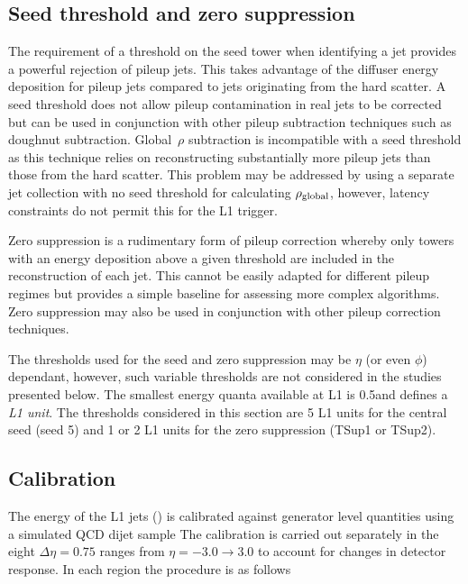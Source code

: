 \subsection{Seed threshold and zero suppression}
\label{sec:seed_thresh}

The requirement of a threshold on the seed tower when identifying a jet
provides a powerful rejection of pileup jets. This takes advantage of the
diffuser energy deposition for pileup jets compared to jets originating from 
the hard scatter. A seed threshold does not allow pileup contamination in real jets to be corrected
but can be used in conjunction with other pileup subtraction techniques such as doughnut
subtraction. Global~$\rho$ subtraction is incompatible with a seed threshold as this technique relies
on reconstructing substantially more pileup jets than those from the hard scatter. 
This problem may be addressed by using a separate jet collection with no seed threshold
for calculating $\rho_{\text{global}}$, however, latency constraints do not permit this for the L1 trigger.

Zero suppression is a rudimentary form of pileup correction whereby only towers with
an energy deposition above a given threshold are included in the reconstruction of each jet.
This cannot be easily adapted for different pileup regimes but provides a simple baseline 
for assessing more complex algorithms. Zero suppression may also be used in conjunction
with other pileup correction techniques. 

The thresholds used for the seed and zero suppression may be $\eta$ (or even $\phi$) dependant, however,
such variable thresholds are not considered in the studies presented below. The smallest energy quanta
available at L1 is 0.5\GeV and defines a \emph{L1 unit}. The thresholds considered in this section are 5 L1 units
for the central seed (seed 5) and 1 or 2 L1 units for the zero suppression (TSup1 or TSup2).

\subsection{Calibration}
\label{sec:calib}
The energy of the L1 jets (\Lonept) is calibrated against generator level quantities using a simulated QCD dijet sample 
The calibration is carried out separately in the eight $\Delta\eta = 0.75$ ranges from $\eta=-3.0\rightarrow3.0$ 
to account for changes in detector response. In each region the procedure is as follows

